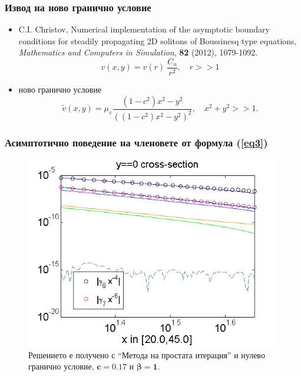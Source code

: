 \documentclass{beamer}
\newcommand{\rf}[1]{(\ref{#1})}
\begin{document}
\begin{frame}
\frametitle{Извод на ново гранично условие}

\begin{itemize}
  \item  C.I. Christov,
Numerical implementation of the asymptotic boundary conditions for steadily propagating 2D solitons of Boussinesq type equations,
{\it Mathematics and Computers in Simulation}, \textbf{82} (2012), 1079-1092.
\begin{equation}
v(x,y) = v(r) ~ \frac{C_u}{r^2}, \quad r>>1
\end{equation}
  \item ново гранично условие
\begin{equation}\label{bndK}
\tilde v(x,y) = \mu_v \frac{ (1-c^2)x^2 - y^2}{ ((1-c^2)x^2 - y^2)^2}, \quad x^2 + y^2 >> 1.
\end{equation}
\end{itemize}
 

\end{frame}

\begin{frame}
\frametitle{Асимптотично поведение на членовете от формула \rf{eq3}}
\begin{figure}
	\includegraphics[width=0.9\linewidth]{../Thesis/AssymptForEachTerm/c017_bt1_5/ChristovIC_AlongX_50_ZB2_bt1_c017_h020_O(h^6).png}
	\caption{Решението е получено с ``Метода на простата итерация'' и нулево гранично условие, $\boldsymbol{c=0.17}$ и $\boldsymbol{\beta = 1}$. }
	\label{fig:assympt_c017bt11}
\end{figure}

\end{frame}
\end{document}
